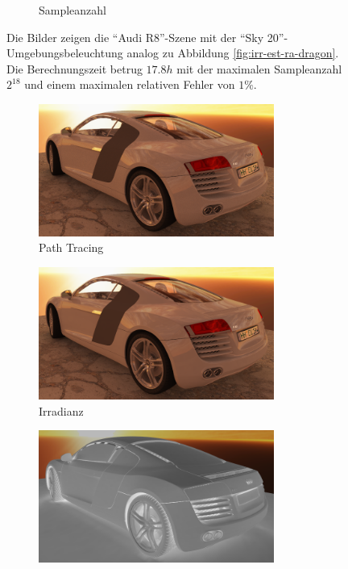 \begin{figure}[h]
\begin{subfigure}[t]{\textwidth}
			\caption{Sampleanzahl}
		\end{subfigure}
		\caption[Adaptive Vertex-Irradiance-Map anhand der \enquote{Audi R8}-Szene]{Die Bilder zeigen die \enquote{Audi R8}-Szene mit der \enquote{Sky 20}-Umgebungsbeleuchtung analog zu Abbildung \ref{fig:irr-est-ra-dragon}. Die Berechnungszeit betrug $17.8\unit{h}$ mit der maximalen Sampleanzahl $2^{18}$ und einem maximalen relativen Fehler von $1\unit{\%}$.}
		\label{fig:irr-est-ra-audi}
	\end{figure}

	\begin{figure}[h]
		\begin{subfigure}[t]{\textwidth}
			\center
			\includegraphics[width=0.85\textwidth]{pic/irr_est-ra-r8_2-ref.png}
			\caption{Path Tracing}
		\end{subfigure}
		\begin{subfigure}[t]{\textwidth}
			\center
			\includegraphics[width=0.85\textwidth]{pic/irr_est-ra-r8_2-irr.png}
			\caption{Irradianz}
		\end{subfigure}
		\begin{subfigure}[t]{\textwidth}
			\center
			\includegraphics[width=0.85\textwidth]{pic/irr_est-ra-r8_2-scount.png}

\end{subfigure}
\end{figure}
